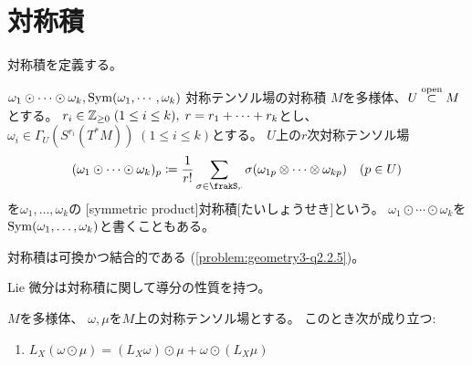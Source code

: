 \documentclass[report]{jlreq}
\begin{document}
\begin{definition}[対称テンソル場]
\end{definition}

%
\section{対称積}

対称積を定義する。

\begin{definition}[対称テンソル場の対称積]
        {$\omega_1 \odot \cdots \odot \omega_k, \operatorname{Sym}(\omega_1, \cdots, \omega_k)$}
        {対称テンソル場の対称積}
    $M$を多様体、$U \stackrel{\text{open}}{\subset} M$とする。
    $r_i \in \mathbb{Z}_{\ge 0} \; (1 \le i \le k), \; r = r_1 + \dots + r_k$とし、
    $\omega_i \in \Gamma_U(S^{r_i}(T^*M)) \; (1 \le i \le k)$とする。
    $U$上の$r$次対称テンソル場
    \begin{equation}
        (\omega_1 \odot \cdots \odot \omega_k)_p
            \coloneqq \frac{1}{r!}
            \sum_{\sigma \in \frakS_r}
            \sigma(\omega_{1p} \otimes \cdots \otimes \omega_{kp})
            \quad (p \in U)
    \end{equation}
    を$\omega_1, \dots, \omega_k$の
    [symmetric product]{対称積}[たいしょうせき]という。
    $\omega_1 \odot \cdots \odot \omega_k$を
    $\operatorname{Sym}(\omega_1, \dots, \omega_k)$と書くこともある。
\end{definition}

\begin{remark}
    対称積は可換かつ結合的である (\cref{problem:geometry3-q2.2.5})。
\end{remark}

Lie 微分は対称積に関して導分の性質を持つ。

\begin{proposition}
    $M$を多様体、
    $\omega, \mu$を$M$上の対称テンソル場とする。
    このとき次が成り立つ:
    \begin{enumerate}
        \item $L_X (\omega \odot \mu)
            = (L_X \omega) \odot \mu + \omega \odot (L_X \mu)$
    \end{enumerate}
\end{proposition}
\end{document}
